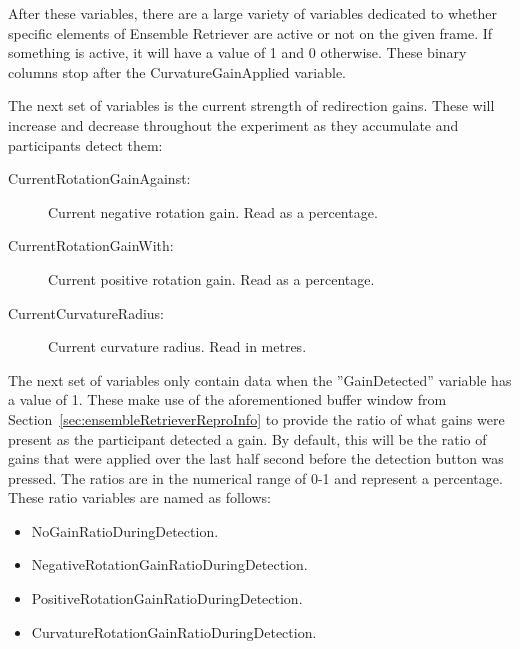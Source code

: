 After these variables, there are a large variety of variables dedicated to whether specific elements of Ensemble Retriever are active or not on the given frame. If something is active, it will have a value of 1 and 0 otherwise. These binary columns stop after the CurvatureGainApplied variable. 

The next set of variables is the current strength of redirection gains. These will increase and decrease throughout the experiment as they accumulate and participants detect them:
\begin{description}
   \item[CurrentRotationGainAgainst:] Current negative rotation gain. Read as a percentage.
   \item[CurrentRotationGainWith:] Current positive rotation gain. Read as a percentage.
   \item[CurrentCurvatureRadius:] Current curvature radius. Read in metres. 
\end{description}

The next set of variables only contain data when the ''GainDetected'' variable has a value of 1. These make use of the aforementioned buffer window from Section~\ref{sec:ensembleRetrieverReproInfo} to provide the ratio of what gains were present as the participant detected a gain. By default, this will be the ratio of gains that were applied over the last half second before the detection button was pressed. The ratios are in the numerical range of 0-1 and represent a percentage. These ratio variables are named as follows:

\begin{itemize}
    \item NoGainRatioDuringDetection.
    \item NegativeRotationGainRatioDuringDetection.
    \item PositiveRotationGainRatioDuringDetection.
    \item CurvatureRotationGainRatioDuringDetection.
\end{itemize}

